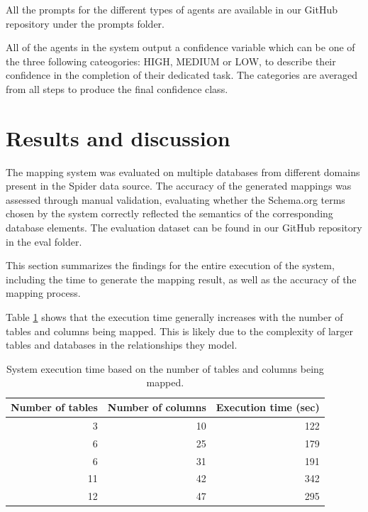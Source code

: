 \documentclass[runningheads]{llncs}
\begin{document}
All the prompts for the different types of agents are available in our GitHub repository \cite{milena_trajanoska_knowledge_graph_agents} under the prompts folder.

All of the agents in the system output a confidence variable which can be one of the three following cateogories: HIGH, MEDIUM or LOW, to describe their confidence in the completion of their dedicated task. The categories are averaged from all steps to produce the final confidence class.

\section{Results and discussion}
The mapping system was evaluated on multiple databases from different domains present in the Spider data source. The accuracy of the generated mappings was assessed through manual validation, evaluating whether the Schema.org terms chosen by the system correctly reflected the semantics of the corresponding database elements. The evaluation dataset can be found in our GitHub repository \cite{milena_trajanoska_knowledge_graph_agents_eval} in the eval folder.

This section summarizes the findings for the entire execution of the system, including the time to generate the mapping result, as well as the accuracy of the mapping process.

Table \ref{tab:res_exec} shows that the execution time generally increases with the number of tables and columns being mapped. This is likely due to the complexity of larger tables and databases in the relationships they model.

\begin{table}[h!]
\caption{System execution time based on the number of tables and columns being mapped.}\label{tab:res_exec}
\begin{tabular}{|r|r|r|}
\hline
\multicolumn{1}{|l|}{\textbf{Number of tables}} & \textbf{Number of columns} & \multicolumn{1}{l|}{\textbf{Execution time (sec)}} \\ \hline
3                                               & 10                         & 122                                                \\ \hline
6                                               & 25                         & 179                                                \\ \hline
6                                               & 31                         & 191                                                \\ \hline
11                                              & 42                         & 342                                                \\ \hline
12                                              & 47                         & 295                                                \\ \hline
\end{tabular}
\end{table}
\end{document}
